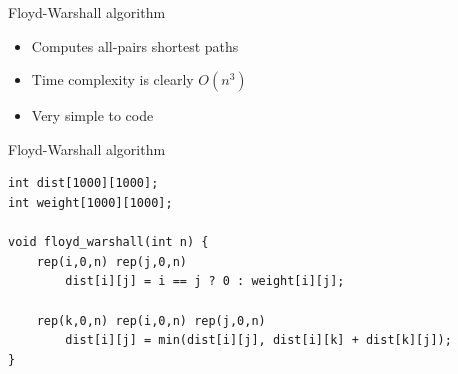 \documentclass{beamer}
\begin{document}
\begin{frame}[plain]{Floyd-Warshall algorithm}
    \begin{itemize}
\item Computes all-pairs shortest paths
\item Time complexity is clearly $O(n^3)$
\item Very simple to code
    \end{itemize}
\end{frame}

\begin{frame}{Floyd-Warshall algorithm}
    \begin{verbatim}
int dist[1000][1000];
int weight[1000][1000];

void floyd_warshall(int n) {
    rep(i,0,n) rep(j,0,n)
        dist[i][j] = i == j ? 0 : weight[i][j];

    rep(k,0,n) rep(i,0,n) rep(j,0,n)
        dist[i][j] = min(dist[i][j], dist[i][k] + dist[k][j]);
}
    \end{verbatim}
\end{frame}
\end{document}
